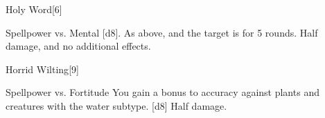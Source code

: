 \begin{spellsection}{Holy Word}[6]
    \begin{spellheader}
    \end{spellheader}
    \begin{spellcontent}
        \begin{spelltargetinginfo}
        \end{spelltargetinginfo}
        \begin{spelleffects}
            \begin{spellattack}{Spellpower vs. Mental}
                \spellsuccess {}[d8].
                \spellcritical As above, and the target is \dazed for 5 rounds.
                \spellfailure Half damage, and no additional effects.
            \end{spellattack}
        \end{spelleffects}
    \end{spellcontent}
    \begin{spellfooter}
        \miscastexplode
    \end{spellfooter}
\end{spellsection}

\begin{spellsection}{Horrid Wilting}[9]
    \begin{spellheader}
    \end{spellheader}
    \begin{spellcontent}
        \begin{spelltargetinginfo}
        \end{spelltargetinginfo}
        \begin{spelleffects}
            \begin{spellattack}{Spellpower vs. Fortitude}
                \spellspecial You gain a  bonus to accuracy against plants and creatures with the water subtype.
                \spellsuccess {}[d8]
                \spellfailure Half damage.
            \end{spellattack}
        \end{spelleffects}
    \end{spellcontent}
    \begin{spellfooter}
        \miscastyou
    \end{spellfooter}
\end{spellsection}

